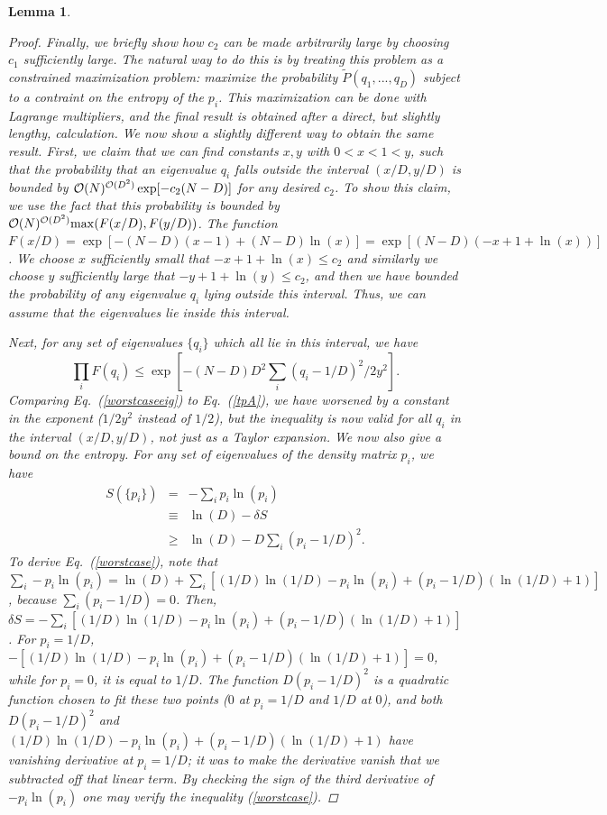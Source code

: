 \documentclass[aps,prl,amsmath,amssymb,amsfonts,superscriptaddress,floatfix]{revtex4}
\newtheorem{lemma}{Lemma}
\newcommand{\be}{\begin{equation}}
\newcommand{\ee}{\end{equation}}
\newcommand{\FF}{F}
\begin{document}
\begin{lemma}
\begin{proof}
Finally, we briefly show how $c_2$ can be made arbitrarily large by
choosing $c_1$ sufficiently large.  The natural way to do this is by
treating this problem as a constrained maximization problem: maximize
the probability $\tilde P(q_1,...,q_D)$ subject to a contraint
on the entropy of the $p_i$.  This maximization can be done with Lagrange
multipliers, and the final result is obtained after
a direct, but slightly lengthy,
calculation.  We now show a slightly different way to obtain the
same result.  First, we claim that we can
find
constants $x,y$ with $0<x<1<y$, such that the probability 
that an eigenvalue $q_i$ falls outside
the interval $(x/D,y/D)$ is bounded by
${\cal O}(N)^{{\cal O}(D^2)} \exp[-c_2 (N-D)]$ for any desired $c_2$.
To show this claim, we use the fact that
this probability is bounded by
${\cal O}(N)^{{\cal O}(D^2)} {\rm max}(\FF(x/D),\FF(y/D))$.
The function $\FF(x/D)=\exp[-(N-D)(x-1)+(N-D)\ln(x)]=\exp[(N-D)(-x+1+\ln(x))]$.
We choose $x$ sufficiently small that $-x+1+\ln(x)\leq c_2$ and similarly
we choose $y$ sufficiently large that $-y+1+\ln(y)\leq c_2$, and then
we have bounded the probability of any eigenvalue $q_i$ lying outside
this interval.  Thus, we can assume that the eigenvalues lie inside this
interval.

Next, for any set of eigenvalues $\{q_i\}$ which all lie in this interval,
we have
\be
\label{worstcaseeig}
\prod_i \FF(q_i)\leq \exp[-(N-D)D^2 \sum_i (q_i-1/D)^2/2y^2].
\ee
Comparing Eq.~(\ref{worstcaseeig}) to Eq.~(\ref{tpA}), we have
worsened by a constant in the exponent ($1/2y^2$ instead of $1/2$), but
the inequality is now valid for all $q_i$ in the interval $(x/D,y/D)$,
not just as a Taylor expansion.
We now also give a bound
on the entropy.
For any set of eigenvalues of the density matrix $p_i$, we have
\begin{eqnarray}
\label{worstcase}
S(\{p_i\})&=&-\sum_i p_i \ln(p_i)
\\ \nonumber
&\equiv&\ln(D)-\delta S
\\ \nonumber
&\geq &\ln(D)-D\sum_i (p_i-1/D)^2.
\end{eqnarray}
To derive Eq.~(\ref{worstcase}), note that
$\sum_i -p_i \ln(p_i)=\ln(D)+\sum_i [(1/D) \ln(1/D)-p_i\ln(p_i)+(p_i-1/D) (\ln(1/D)+1)]$, because $\sum_i (p_i-1/D)=0$.
Then, $\delta S=
-\sum_i [(1/D) \ln(1/D)-p_i\ln(p_i)+(p_i-1/D) (\ln(1/D)+1)]$.  For $p_i=1/D$,
$-[(1/D) \ln(1/D)-p_i\ln(p_i)+(p_i-1/D) (\ln(1/D)+1)]=0$, while for $p_i=0$, it is
equal to $1/D$.  The function $D (p_i-1/D)^2$ is a quadratic function
chosen to fit these two points ($0$ at $p_i=1/D$ and $1/D$ at $0$), and
both $D(p_i-1/D)^2$ and
$(1/D) \ln(1/D)-p_i\ln(p_i)+(p_i-1/D) (\ln(1/D)+1)$ have vanishing
derivative at $p_i=1/D$; it was to make the derivative vanish that
we subtracted off that linear term.
By checking the sign of the third derivative of $-p_i \ln(p_i)$ one
may verify the inequality (\ref{worstcase}).


\end{proof}
\end{lemma}
\end{document}
